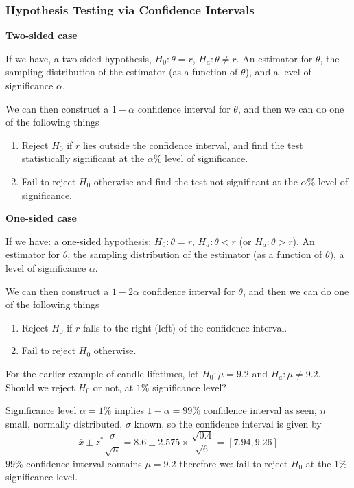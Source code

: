 \documentclass[10pt, a4paper]{article}
\begin{document}
\subsubsection{Hypothesis Testing via Confidence Intervals}
\textbf{Two-sided case}

If we have,
a two-sided hypothesis,
$H_0 : \theta = r$,
$H_a : \theta \neq r$.
An estimator for $\theta$,
the sampling distribution of the estimator
(as a function of $\theta$),
and a level of significance $\alpha$.

We can then construct a $1 - \alpha$ confidence interval for $\theta$,
and then we can do one of the following things
\begin{enumerate}[label = (\roman*)]
    \item Reject $H_0$ if $r$ lies outside the confidence interval,
    and find the test statistically significant at the $\alpha\%$ level of significance.

    \item Fail to reject $H_0$ otherwise and find the test not significant at the $\alpha\%$ level of significance.
\end{enumerate}

\textbf{One-sided case}

If we have:
a one-sided hypothesis:
$H_0 : \theta = r$,
$H_a : \theta < r$
(or $H_a : \theta > r$).
An estimator for $\theta$,
the sampling distribution of the estimator
(as a function of $\theta$),
a level of significance $\alpha$.

We can then construct a $1 - 2\alpha$ confidence interval for $\theta$,
and then we can do one of the following things
\begin{enumerate}[label = (\roman*)]
    \item Reject $H_0$ if $r$ falls to the right
    (left)
    of the confidence interval.

    \item Fail to reject $H_0$ otherwise.
\end{enumerate}

\begin{example}
    For the earlier example of candle lifetimes,
    let $H_0 : \mu = 9.2$ and $H_a : \mu \neq 9.2$.
    Should we reject $H_0$ or not,
    at $1\%$ significance level?

    \begin{solution}
        Significance level $\alpha = 1\%$ implies $1 - \alpha = 99\%$ confidence interval as seen, $n$ small,
        normally distributed,
        $\sigma$ known,
        so the confidence interval is given by
        \[
        \bar{x} \pm z ^ {*}\frac{\sigma}{\sqrt{n}} = 8.6 \pm 2.575 \times \frac{\sqrt{0.4}}{\sqrt{6}} = [7.94, 9.26]
        \]
        $99\%$ confidence interval contains $\mu = 9.2$ therefore we:
        fail to reject $H_0$ at the $1\%$ significance level.
    \end{solution}
\end{example}
\end{document}

